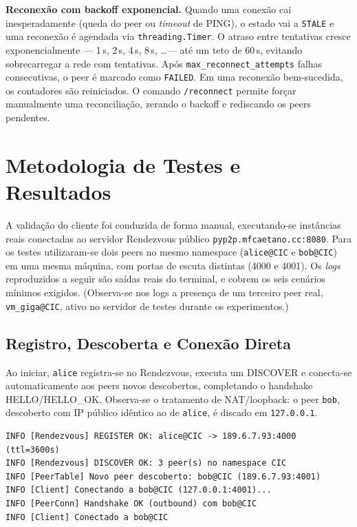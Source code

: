 \documentclass[12pt, a4paper]{article}
\begin{document}
\textbf{Reconexão com backoff exponencial.} Quando uma conexão cai inesperadamente (queda do peer ou \textit{timeout} de PING), o estado vai a \texttt{STALE} e uma reconexão é agendada via \texttt{threading.Timer}. O atraso entre tentativas cresce exponencialmente --- 1\,s, 2\,s, 4\,s, 8\,s, \ldots --- até um teto de 60\,s, evitando sobrecarregar a rede com tentativas. Após \texttt{max\_reconnect\_attempts} falhas consecutivas, o peer é marcado como \texttt{FAILED}. Em uma reconexão bem-sucedida, os contadores são reiniciados. O comando \texttt{/reconnect} permite forçar manualmente uma reconciliação, zerando o backoff e rediscando os peers pendentes.

\section{Metodologia de Testes e Resultados}
\label{sec:testes}
A validação do cliente foi conduzida de forma manual, executando-se instâncias reais conectadas ao servidor Rendezvous público \texttt{pyp2p.mfcaetano.cc:8080}. Para os testes utilizaram-se dois peers no mesmo namespace (\texttt{alice@CIC} e \texttt{bob@CIC}) em uma mesma máquina, com portas de escuta distintas (4000 e 4001). Os \textit{logs} reproduzidos a seguir são saídas reais do terminal, e cobrem os seis cenários mínimos exigidos. (Observa-se nos logs a presença de um terceiro peer real, \texttt{vm\_giga@CIC}, ativo no servidor de testes durante os experimentos.)

\subsection{Registro, Descoberta e Conexão Direta}
Ao iniciar, \texttt{alice} registra-se no Rendezvous, executa um DISCOVER e conecta-se automaticamente aos peers novos descobertos, completando o handshake HELLO/HELLO\_OK. Observa-se o tratamento de NAT/loopback: o peer \texttt{bob}, descoberto com IP público idêntico ao de \texttt{alice}, é discado em \texttt{127.0.0.1}.

\begin{lstlisting}[style=terminal]
INFO [Rendezvous] REGISTER OK: alice@CIC -> 189.6.7.93:4000 (ttl=3600s)
INFO [Rendezvous] DISCOVER OK: 3 peer(s) no namespace CIC
INFO [PeerTable] Novo peer descoberto: bob@CIC (189.6.7.93:4001)
INFO [Client] Conectando a bob@CIC (127.0.0.1:4001)...
INFO [PeerConn] Handshake OK (outbound) com bob@CIC
INFO [Client] Conectado a bob@CIC
\end{lstlisting}
\end{document}

